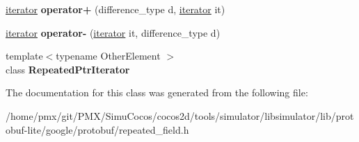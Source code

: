 \begin{DoxyCompactItemize}
\item 
\mbox{\label{classgoogle_1_1protobuf_1_1internal_1_1RepeatedPtrOverPtrsIterator_a5e9d8a6dabf69707d192096eebebbeec}} 
\hyperlink{classgoogle_1_1protobuf_1_1internal_1_1RepeatedPtrOverPtrsIterator}{iterator} {\bfseries operator+} (difference\+\_\+type d, \hyperlink{classgoogle_1_1protobuf_1_1internal_1_1RepeatedPtrOverPtrsIterator}{iterator} it)
\item 
\mbox{\label{classgoogle_1_1protobuf_1_1internal_1_1RepeatedPtrOverPtrsIterator_a8d36089dbd29c1f35389f85f71479136}} 
\hyperlink{classgoogle_1_1protobuf_1_1internal_1_1RepeatedPtrOverPtrsIterator}{iterator} {\bfseries operator-\/} (\hyperlink{classgoogle_1_1protobuf_1_1internal_1_1RepeatedPtrOverPtrsIterator}{iterator} it, difference\+\_\+type d)
\item 
\mbox{\label{classgoogle_1_1protobuf_1_1internal_1_1RepeatedPtrOverPtrsIterator_a979a8adada203d57ffbf289a07351cda}} 
{\footnotesize template$<$typename Other\+Element $>$ }\\class {\bfseries Repeated\+Ptr\+Iterator}
\end{DoxyCompactItemize}


The documentation for this class was generated from the following file\+:\begin{DoxyCompactItemize}
\item 
/home/pmx/git/\+P\+M\+X/\+Simu\+Cocos/cocos2d/tools/simulator/libsimulator/lib/protobuf-\/lite/google/protobuf/repeated\+\_\+field.\+h\end{DoxyCompactItemize}
